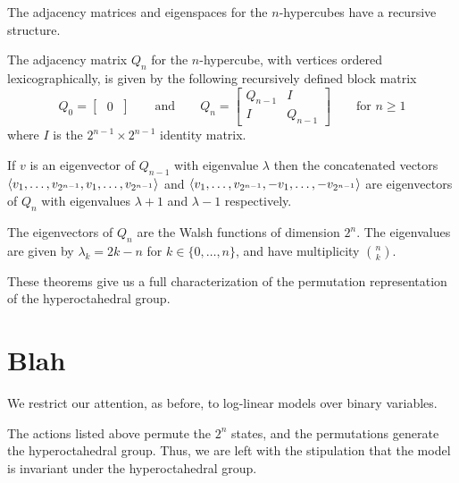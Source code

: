 \documentclass[cclicense]{hmcthesis}
\numberwithin{equation}{chapter}
\numberwithin{thmcounter}{chapter}
\begin{document}
    The adjacency matrices and eigenspaces for the $n$-hypercubes have a
    recursive structure.
    \begin{theorem}[\cite{CW06}]
        The adjacency matrix $Q_n$ for the $n$-hypercube, with vertices ordered
        lexicographically, is given by the following recursively defined block
        matrix
        \[
            Q_0 = \begin{bmatrix} \;0\; \end{bmatrix}
            \qquad
            \text{and}
            \qquad
            Q_n = \begin{bmatrix}
                Q_{n-1} & I \\
                I & Q_{n-1}
            \end{bmatrix}
            \qquad
            \text{for $n \ge 1$}
        \]
        where $I$ is the $2^{n-1}\times 2^{n-1}$ identity matrix.
    \end{theorem}

    \begin{theorem}[\cite{CW06}]
        If $v$ is an eigenvector of $Q_{n-1}$ with eigenvalue $\lambda$ then the
        concatenated vectors $\langle v_1, \ldots, v_{2^{n-1}},v_1, \ldots,
        v_{2^{n-1}}\rangle$ and $\langle v_1, \ldots, v_{2^{n-1}}, -v_1, \ldots,
        -v_{2^{n-1}}\rangle$ are eigenvectors of $Q_n$ with eigenvalues $\lambda +1$
        and $\lambda - 1$ respectively.
    \end{theorem}

    \begin{theorem}[\cite{CW06}]
        The eigenvectors of $Q_n$ are the Walsh functions of dimension $2^n$.
        The eigenvalues are given by $\lambda_k = 2k - n$ for $k \in \{0,
        \ldots, n\}$, and have multiplicity $\binom{n}{k}$.
    \end{theorem}

    These theorems give us a full characterization of the permutation
    representation of the hyperoctahedral group.



\section{Blah}

    We restrict our attention, as before, to log-linear models over binary
    variables.

    The actions listed above permute the $2^n$ states, and the permutations
    generate the hyperoctahedral group.  Thus, we are left with the stipulation
    that the model is invariant under the hyperoctahedral group.
\end{document}
